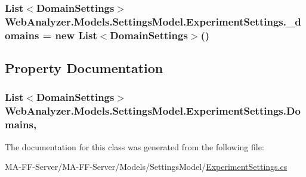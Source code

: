 \subsubsection[{\+\_\+domains}]{\setlength{\rightskip}{0pt plus 5cm}List$<${\bf Domain\+Settings}$>$ Web\+Analyzer.\+Models.\+Settings\+Model.\+Experiment\+Settings.\+\_\+domains = new List$<${\bf Domain\+Settings}$>$()\hspace{0.3cm}{\ttfamily [private]}}\label{class_web_analyzer_1_1_models_1_1_settings_model_1_1_experiment_settings_af281048ad1d067569180dcae2d763522}


\subsection{Property Documentation}
\hypertarget{class_web_analyzer_1_1_models_1_1_settings_model_1_1_experiment_settings_a3eb9dd2816871834368fe4dfd5a1b52e}{}
\subsubsection[{Domains}]{\setlength{\rightskip}{0pt plus 5cm}List$<${\bf Domain\+Settings}$>$ Web\+Analyzer.\+Models.\+Settings\+Model.\+Experiment\+Settings.\+Domains\hspace{0.3cm}{\ttfamily [get]}, {\ttfamily [set]}}\label{class_web_analyzer_1_1_models_1_1_settings_model_1_1_experiment_settings_a3eb9dd2816871834368fe4dfd5a1b52e}


The documentation for this class was generated from the following file\+:\begin{DoxyCompactItemize}
\item 
M\+A-\/\+F\+F-\/\+Server/\+M\+A-\/\+F\+F-\/\+Server/\+Models/\+Settings\+Model/\hyperlink{_experiment_settings_8cs}{Experiment\+Settings.\+cs}\end{DoxyCompactItemize}
